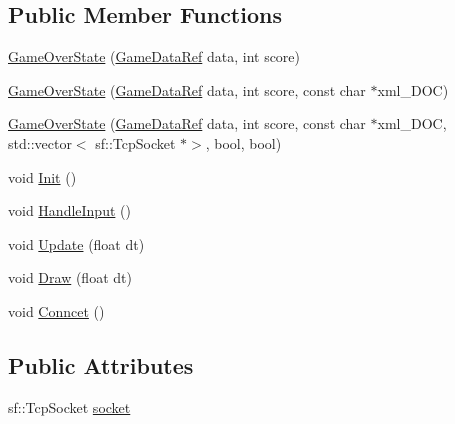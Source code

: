 \subsection*{Public Member Functions}
\begin{DoxyCompactItemize}
\item 
\hyperlink{classSekander_1_1GameOverState_a8248a663f0624ca7f1c081cd0174b396}{Game\+Over\+State} (\hyperlink{namespaceSekander_a1d69b002ba2d23020901c28f0def5e16}{Game\+Data\+Ref} data, int score)
\item 
\hyperlink{classSekander_1_1GameOverState_a3e432a73ee48a8048c2d5a34226cae4b}{Game\+Over\+State} (\hyperlink{namespaceSekander_a1d69b002ba2d23020901c28f0def5e16}{Game\+Data\+Ref} data, int score, const char $\ast$xml\+\_\+\+D\+OC)
\item 
\hyperlink{classSekander_1_1GameOverState_aa856c012e9c97ac48360e089d39f0fb5}{Game\+Over\+State} (\hyperlink{namespaceSekander_a1d69b002ba2d23020901c28f0def5e16}{Game\+Data\+Ref} data, int score, const char $\ast$xml\+\_\+\+D\+OC, std\+::vector$<$ sf\+::\+Tcp\+Socket $\ast$$>$, bool, bool)
\item 
void \hyperlink{classSekander_1_1GameOverState_a1f0b4815da9cfb5221f2e3374b003de0}{Init} ()
\item 
void \hyperlink{classSekander_1_1GameOverState_ade27fc3af036b3c50df4ccf6cb795627}{Handle\+Input} ()
\item 
void \hyperlink{classSekander_1_1GameOverState_a00b3dcb61cb0342cf0fe4cc181e99b6b}{Update} (float dt)
\item 
void \hyperlink{classSekander_1_1GameOverState_af2407df4e95d8add41ed995157bc0905}{Draw} (float dt)
\item 
void \hyperlink{classSekander_1_1GameOverState_a577c6f01f9d687d772cefd17c2643e5f}{Conncet} ()
\end{DoxyCompactItemize}
\subsection*{Public Attributes}
\begin{DoxyCompactItemize}
\item 
sf\+::\+Tcp\+Socket \hyperlink{classSekander_1_1GameOverState_a664bfe46410e08bd6a9d399ac3e79dc3}{socket}
\end{DoxyCompactItemize}
